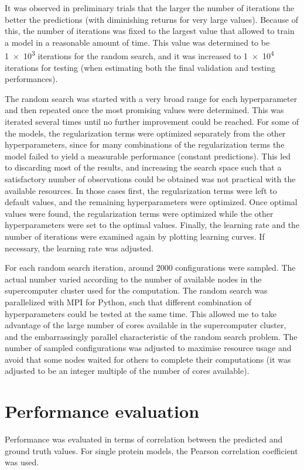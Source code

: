 It was observed in preliminary trials that the larger the number of iterations the better the predictions (with diminishing returns for very large values).
Because of this, the number of iterations was fixed to the largest value that allowed to train a model in a reasonable amount of time.
This value was determined to be \num{1e3} iterations for the random search, and it was increased to \num{1e4} iterations for testing (when estimating both the final validation and testing performances).

The random search was started with a very broad range for each hyperparameter and then repeated once the most promising values were determined.
This was iterated several times until no further improvement could be reached.
For some of the models, the regularization terms were optimized separately from the other hyperparameters, since for many combinations of the regularization terms the model failed to yield a measurable performance (constant predictions).
This led to discarding most of the results, and increasing the search space such that a satisfactory number of observations could be obtained was not practical with the available resources.
In those cases first, the regularization terms were left to default values, and the remaining hyperparameters were optimized.
Once optimal values were found, the regularization terms were optimized while the other hyperparameters were set to the optimal values.
Finally, the learning rate and the number of iterations were examined again by plotting learning curves.
If necessary, the learning rate was adjusted.


For each random search iteration, around \num{2000} configurations were sampled.
The actual number varied according to the number of available nodes in the supercomputer cluster used for the computation.
The random search was parallelized with MPI for Python, such that different combination of hyperparameters could be tested at the same time.
This allowed me to take advantage of the large number of cores available in the supercomputer cluster, and the embarrassingly parallel characteristic of the random search problem.
The number of sampled configurations was adjusted to maximise resource usage and avoid that some nodes waited for others to complete their computations (it was adjusted to be an integer multiple of the number of cores available).

\section{Performance evaluation}
Performance was evaluated in terms of correlation between the predicted and ground truth values.
For single protein models, the Pearson correlation coefficient was used.

